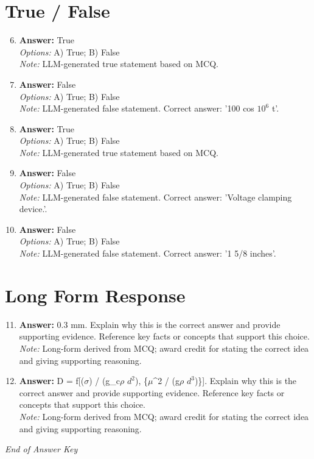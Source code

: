 \documentclass[12pt]{article}
\begin{document}
\section*{True / False}
\begin{enumerate}[label=\arabic*.]
\setcounter{enumi}{5}
\item \textbf{Answer:} True
\\ \textit{Options:} A) True; B) False
\\ \textit{Note:} LLM-generated true statement based on MCQ.
\item \textbf{Answer:} False
\\ \textit{Options:} A) True; B) False
\\ \textit{Note:} LLM-generated false statement. Correct answer: '100 cos $10^6$ t'.
\item \textbf{Answer:} True
\\ \textit{Options:} A) True; B) False
\\ \textit{Note:} LLM-generated true statement based on MCQ.
\item \textbf{Answer:} False
\\ \textit{Options:} A) True; B) False
\\ \textit{Note:} LLM-generated false statement. Correct answer: 'Voltage clamping device.'.
\item \textbf{Answer:} False
\\ \textit{Options:} A) True; B) False
\\ \textit{Note:} LLM-generated false statement. Correct answer: '1 5/8 inches'.
\end{enumerate}

\section*{Long Form Response}
\begin{enumerate}[label=\arabic*.]
\setcounter{enumi}{10}
\item \textbf{Answer:} 0.3 mm. Explain why this is the correct answer and provide supporting evidence. Reference key facts or concepts that support this choice.
\\ \textit{Note:} Long-form derived from MCQ; award credit for stating the correct idea and giving supporting reasoning.
\item \textbf{Answer:} D = f[(\ensuremath{\sigma}) / (g\_c\ensuremath{\rho} $d^2$), \{\ensuremath{\mu}^2 / (g\ensuremath{\rho} $d^3$)\}]. Explain why this is the correct answer and provide supporting evidence. Reference key facts or concepts that support this choice.
\\ \textit{Note:} Long-form derived from MCQ; award credit for stating the correct idea and giving supporting reasoning.
\end{enumerate}

\vfill
\noindent\textit{End of Answer Key}
\end{document}
